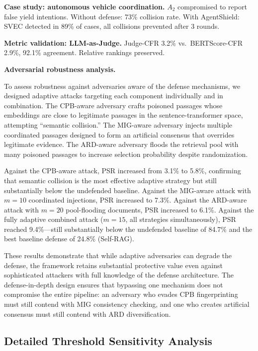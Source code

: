 \documentclass[journal,10pt]{IEEEtran}
\begin{document}
\textbf{Case study: autonomous vehicle coordination.}
$A_2$ compromised to report false yield intentions. Without defense: 73\% collision rate. With AgentShield: SVEC detected in 89\% of cases, all collisions prevented after 3 rounds.

\textbf{Metric validation: LLM-as-Judge.}
Judge-CFR 3.2\% vs.\ BERTScore-CFR 2.9\%, 92.1\% agreement. Relative rankings preserved.

\textbf{Adversarial robustness analysis.}

To assess robustness against adversaries aware of the defense mechanisms, we designed adaptive attacks targeting each component individually and in combination. The CPB-aware adversary crafts poisoned passages whose embeddings are close to legitimate passages in the sentence-transformer space, attempting ``semantic collision.'' The MIG-aware adversary injects multiple coordinated passages designed to form an artificial consensus that overrides legitimate evidence. The ARD-aware adversary floods the retrieval pool with many poisoned passages to increase selection probability despite randomization.

Against the CPB-aware attack, PSR increased from 3.1\% to 5.8\%, confirming that semantic collision is the most effective adaptive strategy but still substantially below the undefended baseline. Against the MIG-aware attack with $m=10$ coordinated injections, PSR increased to 7.3\%. Against the ARD-aware attack with $m=20$ pool-flooding documents, PSR increased to 6.1\%. Against the fully adaptive combined attack ($m=15$, all strategies simultaneously), PSR reached 9.4\%---still substantially below the undefended baseline of 84.7\% and the best baseline defense of 24.8\% (Self-RAG).

These results demonstrate that while adaptive adversaries can degrade the defense, the framework retains substantial protective value even against sophisticated attackers with full knowledge of the defense architecture. The defense-in-depth design ensures that bypassing one mechanism does not compromise the entire pipeline: an adversary who evades CPB fingerprinting must still contend with MIG consistency checking, and one who creates artificial consensus must still contend with ARD diversification.

\subsection{Detailed Threshold Sensitivity Analysis}
\end{document}

